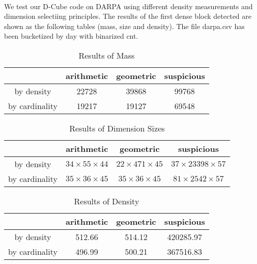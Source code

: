 \paragraph{} We test our D-Cube\cite{shin2017dcube} code on DARPA using different density measurements and dimension selectiing principles. The results of the first dense block detected are shown as the following tables (mass, size and density). The file darpa.csv has been bucketized by day with binarized cnt.\\

\begin{table}[htb]
\begin{center}
\begin{tabular}{|c|c|c|c|}
  \hline 
  & arithmetic & geometric & suspicious\\\hline
  by density & 22728 & 39868 & 99768\\\hline
  by cardinality & 19217 & 19127 & 69548 \\
  \hline
\end{tabular}
\caption{Results of Mass}
\label{tab:mass}
\end{center}
\end{table}

\begin{table}[htb]
\begin{center}
\begin{tabular}{|c|c|c|c|}
  \hline 
  & arithmetic & geometric & suspicious\\\hline
  by density & $34 \times 55 \times 44$ &  $22\times 471\times 45$ & $37\times 23398\times 57$\\\hline
  by cardinality &  $35\times 36\times 45$ & $35\times 36\times 45$ & $81\times 2542\times 57$ \\
  \hline
\end{tabular}
\caption{Results of Dimension Sizes}
\label{tab:size}
\end{center}
\end{table}

\begin{table}[htb]
\begin{center}
\begin{tabular}{|c|c|c|c|}
  \hline 
  & arithmetic & geometric & suspicious\\\hline
  by density & 512.66 &  514.12 & 420285.97\\\hline
  by cardinality &  496.99 & 500.21 & 367516.83 \\
  \hline
\end{tabular}
\caption{Results of Density}
\label{tab:size}
\end{center}
\end{table}

